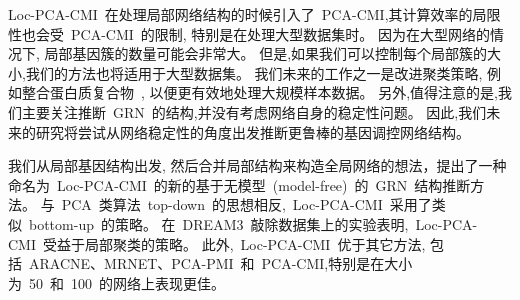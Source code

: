 Loc-PCA-CMI~在处理局部网络结构的时候引入了~PCA-CMI,其计算效率的局限性也会受~PCA-CMI~的限制,
特别是在处理大型数据集时。
因为在大型网络的情况下, 局部基因簇的数量可能会非常大。
但是,如果我们可以控制每个局部簇的大小,我们的方法也将适用于大型数据集。
我们未来的工作之一是改进聚类策略,
例如整合蛋白质复合物~\cite{li2017identification, li2017dynetviewer},
以便更有效地处理大规模样本数据。
另外,值得注意的是,我们主要关注推断~GRN~的结构,并没有考虑网络自身的稳定性问题。
因此,我们未来的研究将尝试从网络稳定性的角度出发推断更鲁棒的基因调控网络结构。

我们从局部基因结构出发, 然后合并局部结构来构造全局网络的想法，提出了一种命名为~Loc-PCA-CMI~的新的基于无模型~(model-free)~的~GRN~结构推断方法。
与~PCA~类算法~top-down~的思想相反,~Loc-PCA-CMI~采用了类似~bottom-up~的策略。
在~DREAM3~敲除数据集上的实验表明,~Loc-PCA-CMI~受益于局部聚类的策略。
此外,~Loc-PCA-CMI~优于其它方法,
包括~ARACNE、MRNET、PCA-PMI~和~PCA-CMI,特别是在大小为~50~和~100~的网络上表现更佳。